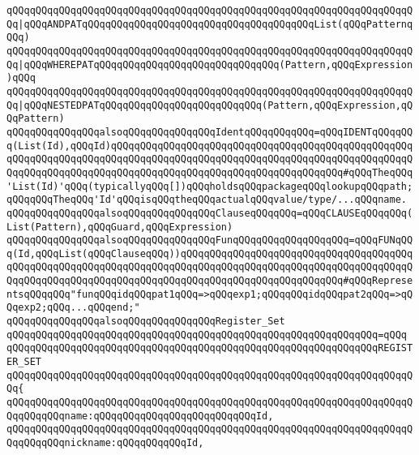 \verb|qQQqqQQqqQQqqQQqqQQqqQQqqQQqqQQqqQQqqQQqqQQqqQQqqQQqqQQqqQQqqQQqqQQqqQQq|\verb#|qQQqANDPATqQQqqQQqqQQqqQQqqQQqqQQqqQQqqQQqqQQqqQQqList(qQQqPatternqQQq)#\newline
\verb|qQQqqQQqqQQqqQQqqQQqqQQqqQQqqQQqqQQqqQQqqQQqqQQqqQQqqQQqqQQqqQQqqQQqqQQq|\verb#|qQQqWHEREPATqQQqqQQqqQQqqQQqqQQqqQQqqQQqqQQq(Pattern,qQQqExpression)qQQq#\newline
\verb|qQQqqQQqqQQqqQQqqQQqqQQqqQQqqQQqqQQqqQQqqQQqqQQqqQQqqQQqqQQqqQQqqQQqqQQq|\verb#|qQQqNESTEDPATqQQqqQQqqQQqqQQqqQQqqQQqqQQq(Pattern,qQQqExpression,qQQqPattern)#\newline
\newline
\verb|qQQqqQQqqQQqqQQqalsoqQQqqQQqqQQqqQQqIdentqQQqqQQqqQQq=qQQqIDENTqQQqqQQq(List(Id),qQQqId)qQQqqQQqqQQqqQQqqQQqqQQqqQQqqQQqqQQqqQQqqQQqqQQqqQQqqQQqqQQqqQQqqQQqqQQqqQQqqQQqqQQqqQQqqQQqqQQqqQQqqQQqqQQqqQQqqQQqqQQqqQQqqQQqqQQqqQQqqQQqqQQqqQQqqQQqqQQqqQQqqQQqqQQqqQQqqQQqqQQq#qQQqTheqQQq'List(Id)'qQQq(typicallyqQQq[])qQQqholdsqQQqpackageqQQqlookupqQQqpath;qQQqqQQqTheqQQq'Id'qQQqisqQQqtheqQQqactualqQQqvalue/type/...qQQqname.|\newline
\newline
\verb|qQQqqQQqqQQqqQQqalsoqQQqqQQqqQQqqQQqClauseqQQqqQQq=qQQqCLAUSEqQQqqQQq(List(Pattern),qQQqGuard,qQQqExpression)|\newline
\newline
\verb|qQQqqQQqqQQqqQQqalsoqQQqqQQqqQQqqQQqFunqQQqqQQqqQQqqQQqqQQq=qQQqFUNqQQq(Id,qQQqList(qQQqClauseqQQq))qQQqqQQqqQQqqQQqqQQqqQQqqQQqqQQqqQQqqQQqqQQqqQQqqQQqqQQqqQQqqQQqqQQqqQQqqQQqqQQqqQQqqQQqqQQqqQQqqQQqqQQqqQQqqQQqqQQqqQQqqQQqqQQqqQQqqQQqqQQqqQQqqQQqqQQqqQQqqQQqqQQqqQQq#qQQqRepresentsqQQqqQQq"funqQQqidqQQqpat1qQQq=>qQQqexp1;qQQqqQQqidqQQqpat2qQQq=>qQQqexp2;qQQq...qQQqend;"|\newline
\newline
\verb|qQQqqQQqqQQqqQQqalsoqQQqqQQqqQQqqQQqRegister_Set|\newline
\verb|qQQqqQQqqQQqqQQqqQQqqQQqqQQqqQQqqQQqqQQqqQQqqQQqqQQqqQQqqQQqqQQq=qQQq|\newline
\verb|qQQqqQQqqQQqqQQqqQQqqQQqqQQqqQQqqQQqqQQqqQQqqQQqqQQqqQQqqQQqqQQqREGISTER_SET|\newline
\verb|qQQqqQQqqQQqqQQqqQQqqQQqqQQqqQQqqQQqqQQqqQQqqQQqqQQqqQQqqQQqqQQqqQQqqQQq{|\newline
\verb|qQQqqQQqqQQqqQQqqQQqqQQqqQQqqQQqqQQqqQQqqQQqqQQqqQQqqQQqqQQqqQQqqQQqqQQqqQQqqQQqname:qQQqqQQqqQQqqQQqqQQqqQQqqQQqId,|\newline
\verb|qQQqqQQqqQQqqQQqqQQqqQQqqQQqqQQqqQQqqQQqqQQqqQQqqQQqqQQqqQQqqQQqqQQqqQQqqQQqqQQqnickname:qQQqqQQqqQQqId,|\newline
